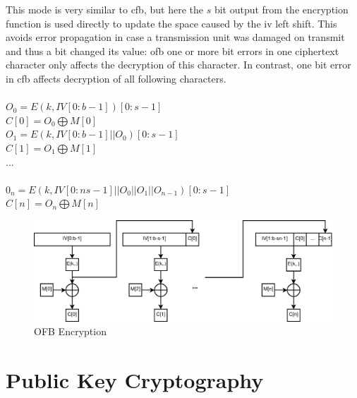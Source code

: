 This mode is very similar to \gls{cfb}, but here the $s$ bit output from the encryption function is used directly to update the space caused by the \gls{iv} 
left shift. This avoids error propagation in case a transmission unit was damaged on transmit and thus a bit changed its value:
\gls{ofb} one or more bit errors in one ciphertext character only affects the decryption of this character. In contrast, one bit error in \gls{cfb} affects
decryption of all following characters.
\\
\\
$O_0 = E(k, IV[0:b-1])[0:s-1]$\\
$C[0] = O_0 \bigoplus M[0]$\\
 $O_1 = E(k, IV[0:b-1] || O_0)[0:s-1]$\\
 $C[1] = O_1 \bigoplus M[1]$\\
 ... \\
 \\
 $0_n = E(k, IV[0:ns-1] || O_0 || O_1 || O_{n-1})[0:s-1]$\\
 $C[n] = O_n \bigoplus M[n]$\\

\begin{figure}
    \centering
    \includegraphics[width=1\textwidth]{figures/OFB.eps}
    \caption{OFB Encryption}
    \label{fig:ofb}
\end{figure}

\section{Public Key Cryptography}

